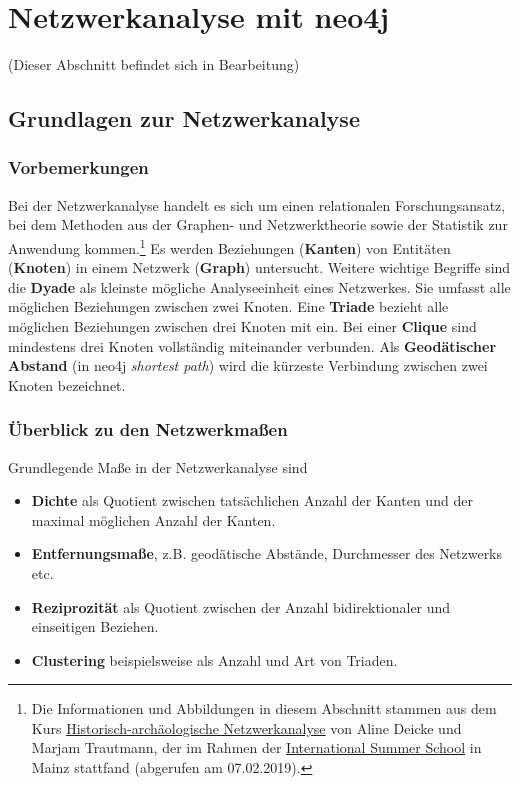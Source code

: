 \documentclass[ngerman,]{scrreprt}
\providecommand{\tightlist}{%
  \setlength{\itemsep}{0pt}\setlength{\parskip}{0pt}}
\begin{document}
\chapter{Netzwerkanalyse mit neo4j}\label{netzwerkanalyse-mit-neo4j}

(Dieser Abschnitt befindet sich in Bearbeitung)

\section{Grundlagen zur Netzwerkanalyse}\label{grundlagen-zur-netzwerkanalyse}

\subsection{Vorbemerkungen}\label{vorbemerkungen}

Bei der Netzwerkanalyse handelt es sich um einen relationalen Forschungsansatz, bei dem Methoden aus der Graphen- und Netzwerktheorie sowie der Statistik zur Anwendung kommen.\footnote{Die Informationen und Abbildungen in diesem Abschnitt stammen aus dem Kurs \href{https://digitale-methodik.adwmainz.net/mod5/5c/slides/networkAnalysis/2018/\#/step-1}{Historisch-archäologische Netzwerkanalyse} von Aline Deicke und Marjam Trautmann, der im Rahmen der \href{https://iss.adwmainz.net}{International Summer School} in Mainz stattfand (abgerufen am 07.02.2019).} Es werden Beziehungen (\textbf{Kanten}) von Entitäten (\textbf{Knoten}) in einem Netzwerk (\textbf{Graph}) untersucht. Weitere wichtige Begriffe sind die \textbf{Dyade} als kleinste mögliche Analyseeinheit eines Netzwerkes. Sie umfasst alle möglichen Beziehungen zwischen zwei Knoten. Eine \textbf{Triade} bezieht alle möglichen Beziehungen zwischen drei Knoten mit ein. Bei einer \textbf{Clique} sind mindestens drei Knoten vollständig miteinander verbunden. Als \textbf{Geodätischer Abstand} (in neo4j \emph{shortest path}) wird die kürzeste Verbindung zwischen zwei Knoten bezeichnet.

\subsection{Überblick zu den Netzwerkmaßen}\label{uxfcberblick-zu-den-netzwerkmauxdfen}

Grundlegende Maße in der Netzwerkanalyse sind

\begin{itemize}
\tightlist
\item
  \textbf{Dichte} als Quotient zwischen tatsächlichen Anzahl der Kanten und der maximal möglichen Anzahl der Kanten.
\item
  \textbf{Entfernungsmaße}, z.B. geodätische Abstände, Durchmesser des Netzwerks etc.
\item
  \textbf{Reziprozität} als Quotient zwischen der Anzahl bidirektionaler und einseitigen Beziehen.
\item
  \textbf{Clustering} beispielsweise als Anzahl und Art von Triaden.
\end{itemize}
\end{document}
